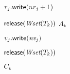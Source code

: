 \begin{algorithm*}[!ht]
\begin{algorithmic}[1]
\begin{multicols}{2}
{{		\EndFor
			\State $r_j.\lit{write}(nr_j + 1)$ 
			 		
		\EndFor
			\State $\lit{release}(\Wset(T_k))$
			\Return $A_k$ \EndReturn
		\EndIf
		
	 		 \State  $v_j.\lit{write}(\textit{nv}_j)$
			 
		\EndFor		
		
  		\State $\lit{release}(\Wset(T_k))$	
 		
   		\Return $C_k$ \EndReturn
   	 }\EndPart		
	
	\Statex
 	\EndPart
% 	
	}
	\end{multicols}
  \end{algorithmic}
\end{algorithm*}

